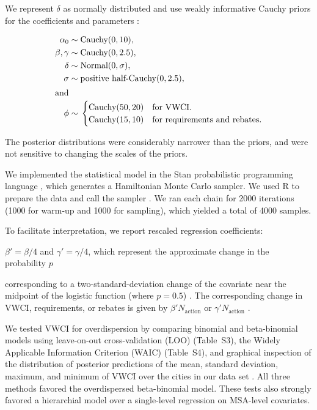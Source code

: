 \documentclass[draft,linenumbers]{agujournal}\usepackage{knitr}
\begin{document}
We represent $\delta$ as normally distributed and use weakly informative Cauchy priors for the coefficients and parameters \citep{gelman_prior_2008}:
\begin{linenomath*}
\begin{align}
\alpha_0 \sim{}& \text{Cauchy}(0,10),\\
\beta, \gamma \sim{} & \text{Cauchy}(0,2.5),\\
\delta \sim{}& \text{Normal}(0,\sigma),\\
\sigma \sim{}& \text{positive half-Cauchy}(0,2.5),\\
\intertext{and}
\phi \sim{}& \begin{cases}
\text{Cauchy}(50,20) & \text{for VWCI}. \\
\text{Cauchy}(15,10) & \text{for requirements and rebates}. \\
\end{cases}
\end{align}
\end{linenomath*}
The posterior distributions were considerably narrower than the priors, and were not sensitive to changing the scales of the priors.

We implemented the statistical model in the Stan probabilistic programming language \citep{stan_2016}, which generates a Hamiltonian Monte Carlo sampler. We used R to prepare the data and call the sampler \citep{r_manual_2016}.
We ran each chain for 2000 iterations (1000 for warm-up and 1000 for sampling), which yielded a total of 4000 samples.

To facilitate interpretation, we report rescaled regression coefficients:
\iffalse
$\beta' = N_{\text{action}} \beta / 4$ and $\gamma' = N_{\text{action}} \gamma / 4$,
which represent the approximate change in VWCI (or requirements or rebates)
\else
$\beta' = \beta / 4$ and $\gamma' = \gamma / 4$, which represent the approximate change in the probability $p$
\fi
corresponding to a two-standard-deviation change of the covariate near the midpoint of the logistic function (where $p = 0.5$) \citep[pp.~81--82]{gelman_arm_2007}. The corresponding change in VWCI, requirements, or rebates is given by $\beta' N_{\text{action}}$ or $\gamma' N_{\text{action}}$ .

We tested VWCI for overdispersion by comparing binomial and beta-binomial models using leave-on-out cross-validation (LOO) (Table~S3), the Widely Applicable Information Criterion (WAIC) (Table~S4), and graphical inspection of the distribution of posterior predictions of the mean, standard deviation, maximum, and minimum of VWCI over the cities in our data set \citep{gelman_bda_2014,vehtari_loo_2016}. All three methods favored the overdispersed beta-binomial model. These tests also strongly favored a hierarchial model over a single-level regression on MSA-level covariates.
\end{document}
